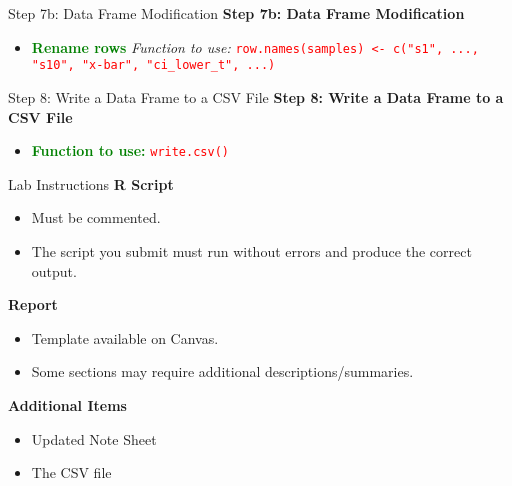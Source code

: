 \documentclass{beamer}
\begin{document}
\begin{frame}{Step 7b: Data Frame Modification}
    \textbf{Step 7b: Data Frame Modification}
    \begin{itemize}
        \item \textcolor{green}{\textbf{Rename rows}}  
        \textit{Function to use:} \textcolor{red}{\texttt{row.names(samples) <- c("s1", ..., "s10", "x-bar", "ci\_lower\_t", ...)}}
    \end{itemize}
\end{frame}

\begin{frame}{Step 8: Write a Data Frame to a CSV File}
    \textbf{Step 8: Write a Data Frame to a CSV File}
    \begin{itemize}
        \item \textcolor{green}{\textbf{Function to use:}}  
        \textcolor{red}{\texttt{write.csv()}}
    \end{itemize}
\end{frame}


\begin{frame}{Lab Instructions}
    \textbf{R Script}
    \begin{itemize}
        \item Must be commented.
        \item The script you submit must run without errors and produce the correct output.
    \end{itemize}
    \textbf{Report}
    \begin{itemize}
        \item Template available on Canvas.
        \item Some sections may require additional descriptions/summaries.
    \end{itemize}
    \textbf{Additional Items}
    \begin{itemize}
        \item Updated Note Sheet
        \item The CSV file
    \end{itemize}
\end{frame}
\end{document}
